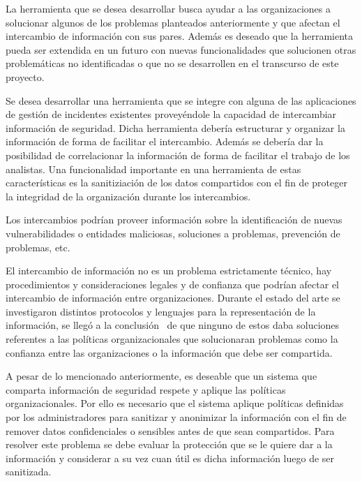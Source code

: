 \bigskip

{
	La herramienta que se desea desarrollar busca ayudar a las organizaciones a solucionar algunos de los problemas
	planteados anteriormente y que afectan el intercambio de información con sus pares. Además es deseado que la
	herramienta pueda ser extendida en un futuro con nuevas funcionalidades que solucionen otras problemáticas no
	identificadas o que no se desarrollen en el transcurso de este proyecto.}


\bigskip

{
	Se desea desarrollar una herramienta que se integre con alguna de las aplicaciones de gestión de incidentes existentes
	proveyéndole la capacidad de intercambiar información de seguridad. Dicha herramienta debería estructurar y organizar
	la información de forma de facilitar el intercambio. Además se debería dar la posibilidad de correlacionar la
	información de forma de facilitar el trabajo de los analistas. Una funcionalidad importante en una herramienta de estas
	características es la sanitiziación de los datos compartidos con el fin de proteger la integridad de la organización
	durante los intercambios.}


\bigskip

{
	Los intercambios podrían proveer información sobre la identificación de nuevas vulnerabilidades o entidades maliciosas,
	soluciones a problemas, prevención de problemas, etc. }


\bigskip

{
	El intercambio de información no es un problema estrictamente técnico, hay procedimientos y consideraciones legales y de
	confianza que podrían afectar el intercambio de información entre organizaciones. Durante el estado del arte se
	investigaron distintos protocolos y lenguajes para la representación de la información, se llegó a la conclusión \ de
	que ninguno de estos daba soluciones referentes a las políticas organizacionales que solucionaran problemas como la
	confianza entre las organizaciones o la información que debe ser compartida.}


\bigskip

{
	A pesar de lo mencionado anteriormente, es deseable que un sistema que comparta información de seguridad respete y
	aplique las políticas organizacionales. Por ello es necesario que el sistema aplique políticas definidas por los
	administradores para sanitizar y anonimizar la información con el fin de remover datos confidenciales o sensibles antes
	de que sean compartidos. Para resolver este problema se debe evaluar la protección que se le quiere dar a la
	información y considerar a su vez cuan útil es dicha información luego de ser sanitizada.}

